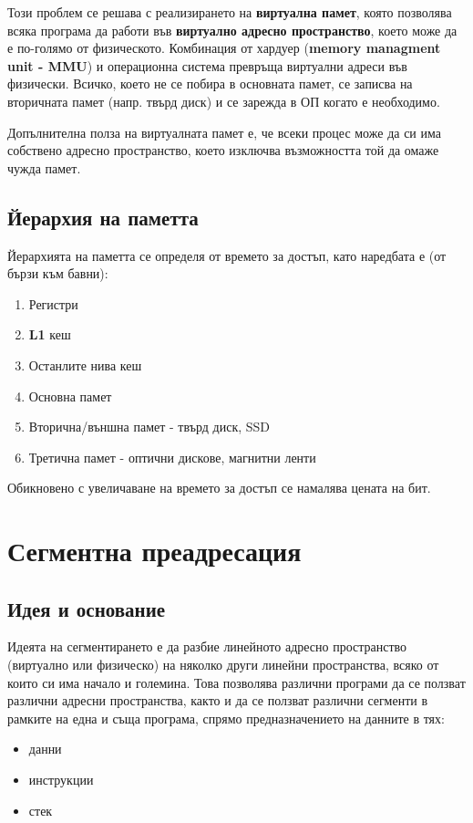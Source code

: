 \documentclass[fleqn,12pt]{article}
\begin{document}
Този проблем се решава с реализирането на \textbf{виртуална памет}, която позволява всяка програма да работи във \textbf{виртуално адресно пространство},
което може да е по-голямо от физическото. Комбинация от хардуер (\textbf{memory managment unit - MMU}) и операционна система превръща 
виртуални адреси във физически. Всичко, което не се побира в основната памет, се записва на вторичната памет (напр. твърд диск) и се 
зарежда в ОП когато е необходимо.

Допълнителна полза на виртуалната памет е, че всеки процес може да си има собствено адресно пространство, което изключва възможността
той да омаже чужда памет.

\subsection{Йерархия на паметта}
Йерархията на паметта се определя от времето за достъп, като наредбата е (от бързи към бавни):
\begin{enumerate}
    \item Регистри
    \item \textbf{L1} кеш
    \item Останлите нива кеш
    \item Основна памет
    \item Вторична/външна памет - твърд диск, SSD
    \item Третична памет - оптични дискове, магнитни ленти
\end{enumerate}

Обикновено с увеличаване на времето за достъп се намалява цената на бит.

\section{Сегментна преадресация}

\subsection{Идея и основание}
Идеята на сегментирането е да разбие линейното адресно пространство (виртуално или физическо) на няколко други линейни пространства,
всяко от които си има начало и големина.
Това позволява различни програми да се ползват различни адресни пространства, както и да се ползват различни сегменти в рамките на една и съща 
програма, спрямо предназначението на данните в тях:
\begin{itemize}
    \item данни
    \item инструкции
    \item стек
\end{itemize}
\end{document}
